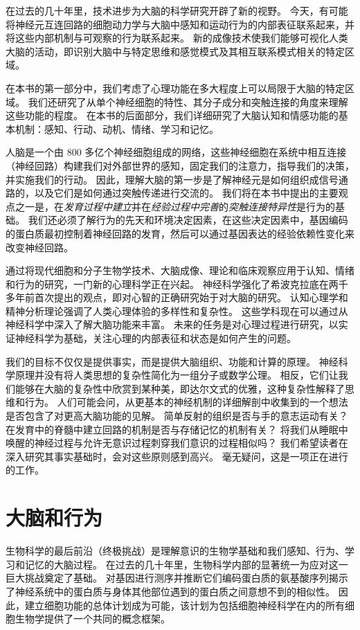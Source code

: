 在过去的几十年里，技术进步为大脑的科学研究开辟了新的视野。
今天，有可能将神经元互连回路的细胞动力学与大脑中感知和运动行为的内部表征联系起来，并将这些内部机制与可观察的行为联系起来。
新的成像技术使我们能够可视化人类大脑的活动，即识别大脑中与特定思维和感觉模式及其相互联系模式相关的特定区域。


在本书的第一部分中，我们考虑了心理功能在多大程度上可以局限于大脑的特定区域。
我们还研究了从单个神经细胞的特性、其分子成分和突触连接的角度来理解这些功能的程度。
在本书的后面部分，我们详细研究了大脑认知和情感功能的基本机制：感知、行动、动机、情绪、学习和记忆。


人脑是一个由 800 多亿个神经细胞组成的网络，这些神经细胞在系统中相互连接（神经回路）构建我们对外部世界的感知，固定我们的注意力，指导我们的决策，并实施我们的行动。
因此，理解大脑的第一步是了解神经元是如何组织成信号通路的，以及它们是如何通过突触传递进行交流的。
我们将在本书中提出的主要观点之一是，在\textit{发育过程中建立}并在\textit{经验过程中完善}的\textit{突触连接特异性}是行为的基础。
我们还必须了解行为的先天和环境决定因素，在这些决定因素中，基因编码的蛋白质最初控制着神经回路的发育，然后可以通过基因表达的经验依赖性变化来改变神经回路。


通过将现代细胞和分子生物学技术、大脑成像、理论和临床观察应用于认知、情绪和行为的研究，一门新的心理科学正在兴起。
神经科学强化了希波克拉底在两千多年前首次提出的观点，即对心智的正确研究始于对大脑的研究。
认知心理学和精神分析理论强调了人类心理体验的多样性和复杂性。
这些学科现在可以通过从神经科学中深入了解大脑功能来丰富。
未来的任务是对心理过程进行研究，以实证神经科学为基础，关注心理的内部表征和状态是如何产生的问题。


我们的目标不仅仅是提供事实，而是提供大脑组织、功能和计算的原理。
神经科学原理并没有将人类思想的复杂性简化为一组分子或数学公理。
相反，它们让我们能够在大脑的复杂性中欣赏到某种美，即达尔文式的优雅，这种复杂性解释了思维和行为。
人们可能会问，从更基本的神经机制的详细解剖中收集到的一个想法是否包含了对更高大脑功能的见解。
简单反射的组织是否与手的意志运动有关？
在发育中的脊髓中建立回路的机制是否与存储记忆的机制有关？
将我们从睡眠中唤醒的神经过程与允许无意识过程刺穿我们意识的过程相似吗？
我们希望读者在深入研究其事实基础时，会对这些原则感到高兴。
毫无疑问，这是一项正在进行的工作。





\chapter{大脑和行为} \label{chap:chap1}
生物科学的最后前沿（终极挑战）是理解意识的生物学基础和我们感知、行为、学习和记忆的大脑过程。 
在过去的几十年里，生物科学内部的显著统一为应对这一巨大挑战奠定了基础。 
对基因进行测序并推断它们编码蛋白质的氨基酸序列揭示了神经系统中的蛋白质与身体其他部位遇到的蛋白质之间意想不到的相似性。 
因此，建立细胞功能的总体计划成为可能，该计划为包括细胞神经科学在内的所有细胞生物学提供了一个共同的概念框架。



